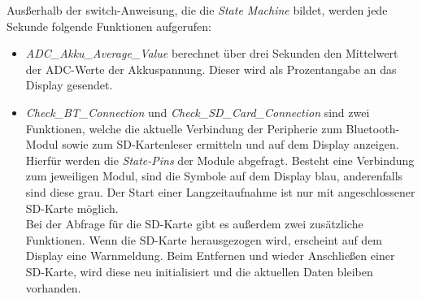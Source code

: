 Ausßerhalb der switch-Anweisung, die die \textit{State Machine} bildet, werden jede Sekunde folgende Funktionen aufgerufen:
\begin{itemize}
    \item \textit{ADC\_Akku\_Average\_Value} berechnet über drei Sekunden den Mittelwert der ADC-Werte der Akkuspannung. Dieser wird als Prozentangabe an das Display gesendet.
    \item \textit{Check\_BT\_Connection} und \textit{Check\_SD\_Card\_Connection} sind zwei Funktionen, welche die aktuelle Verbindung der Peripherie zum Bluetooth-Modul sowie zum SD-Kartenleser ermitteln und auf dem Display anzeigen. Hierfür werden die \textit{State-Pins} der Module abgefragt. Besteht eine Verbindung zum jeweiligen Modul, sind die Symbole auf dem Display blau, anderenfalls sind diese grau. Der Start einer Langzeitaufnahme ist nur mit angeschlossener SD-Karte möglich.\\
    Bei der Abfrage für die SD-Karte gibt es außerdem zwei zusätzliche Funktionen. Wenn die SD-Karte herausgezogen wird, erscheint auf dem Display eine Warnmeldung. Beim Entfernen und wieder Anschließen einer SD-Karte, wird diese neu initialisiert und die aktuellen Daten bleiben vorhanden.
\end{itemize}